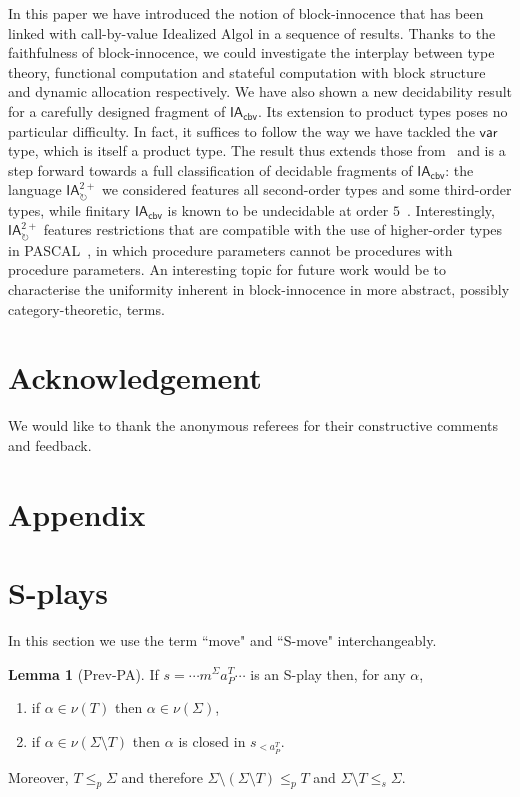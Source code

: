 \documentclass{CSML}
\theoremstyle{definition}\newtheorem{definition}[thm]{Definition}
\theoremstyle{definition}\newtheorem{example}[thm]{Example}
\theoremstyle{definition}\newtheorem{proposition}[thm]{Proposition}
\theoremstyle{definition}\newtheorem{lemma}[thm]{Lemma}
\theoremstyle{definition}\newtheorem{theorem}[thm]{Theorem}
\theoremstyle{definition}\newtheorem{corollary}[thm]{Corollary}
\theoremstyle{definition}\newtheorem{remark}[thm]{Remark}
\renewcommand\Sigma{\varSigma}
\newcommand\Tau{T}
\newcommand\remv{\setminus}
\newcommand\ialoop{\mathsf{IA}_{\circlearrowright}}
\newcommand\iatwo{\ialoop^{2+}}
\newcommand\iacbv{\mathsf{IA}_{\mathsf{cbv}}}
\newcommand\Substore{\leq_p}
\newcommand\substorE{\leq_s}
\newcommand\vart{\mathsf{var}}
\newcommand\na\alpha
\begin{document}
In this paper we have introduced the notion of block-innocence that
has been linked with call-by-value Idealized Algol in a sequence of 
results. Thanks to the faithfulness
of block-innocence, we could investigate the interplay between
type theory, functional computation and stateful computation 
with block structure and dynamic allocation respectively. 
We have also shown a new decidability result for a carefully
designed fragment of $\iacbv$. Its extension to product types
poses no particular difficulty. In fact, it suffices to follow the way we have tackled
the $\vart$ type, which is itself a product type.
The result thus extends those from~\cite{Ghi01} and is a step forward
towards a full classification of decidable fragments of $\iacbv$:
the language $\iatwo$ we considered features all second-order types
and some third-order types, while finitary $\iacbv$ is known to be undecidable
at order $5$~\cite{Mur03b}. Interestingly, $\iatwo$ features restrictions that are 
compatible with the use of higher-order types in PASCAL~\cite{Mit02},
in which procedure parameters cannot be procedures with procedure parameters.
An interesting topic for future work would be to characterise the uniformity inherent in block-innocence in more
abstract, possibly category-theoretic, terms.

\section*{Acknowledgement}

We would like to thank the anonymous referees for their constructive comments and feedback.





\appendix
\section*{Appendix}
\section{S-plays}\label{apx:plays}
In this section we use the term ``move" and ``S-move" interchangeably.

\begin{lemma}[Prev-PA]\label{l:PrevPA}
If $s=\cdots m^\Sigma a_P^\Tau\cdots$ is an S-play then, for any $\na$,
  \begin{enumerate}[label=\({\alph*}]
    \item if $\na\in\nu(\Tau)$ then $\na\in\nu(\Sigma)$,
    \item if $\na\in\nu(\Sigma\remv\Tau)$ then $\na$ is closed in $s_{<a_P^T}$.
  \end{enumerate}
Moreover, $\Tau\Substore\Sigma$ and therefore $\Sigma\remv(\Sigma\remv\Tau)\Substore\Tau$ and $\Sigma\remv\Tau\substorE\Sigma$.
\end{lemma}
\end{document}
